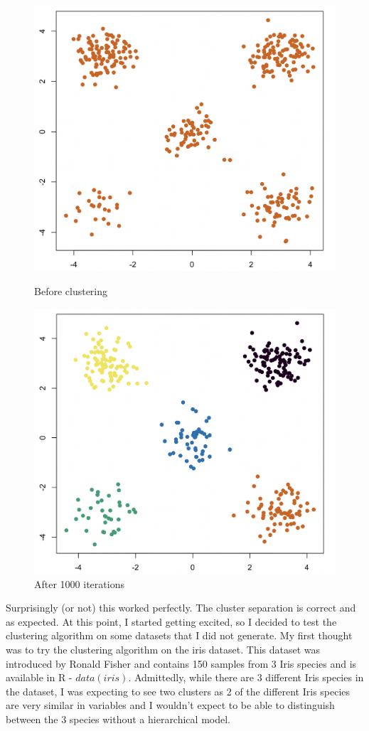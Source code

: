 \documentclass[12pt,a4paper]{article}
\begin{document}
\begin{figure} [H]
    \centering
    \begin{minipage}{.5\textwidth}
      \centering
      \includegraphics[width=0.8\linewidth]{initial_split_data.png}
      \caption{Before clustering}
      \label{fig:before clustering}
    \end{minipage}%
    \begin{minipage}{.5\textwidth}
      \centering
      \includegraphics[width=0.8\linewidth]{split_data_clustered}
      \caption{After 1000 iterations}
      \label{fig:split points after clustering}
    \end{minipage}
\end{figure}
    
Surprisingly (or not) this worked perfectly. The cluster separation is correct and as expected. At this point, I started getting excited, so I decided to test the clustering algorithm on some datasets that I did not generate. My first thought was to try the clustering algorithm on the iris dataset. This dataset was introduced by Ronald Fisher and contains 150 samples from 3 Iris species and is available in R - $data(iris)$. Admittedly, while there are 3 different Iris species in the dataset, I was expecting to see two clusters as 2 of the different Iris species are very similar in variables and I wouldn't expect to be able to distinguish between the 3 species without a hierarchical model.
\end{document}
